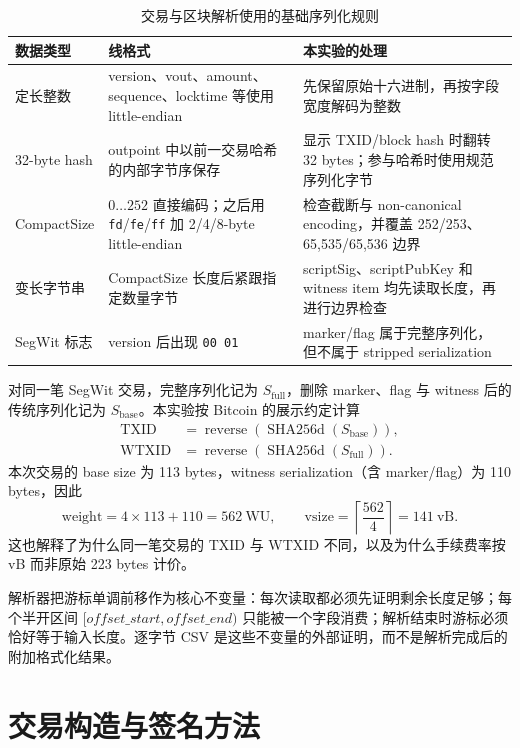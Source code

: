 \documentclass[11pt,a4paper,fontset=none]{ctexart}
\begin{document}
\begin{table}[H]
\centering
\caption{交易与区块解析使用的基础序列化规则}
\label{tab:serialization-rules}
\begin{tabular}{p{}p{}p{}}
\toprule
数据类型 & 线格式 & 本实验的处理 \\
\midrule
定长整数 & version、vout、amount、sequence、locktime 等使用 little-endian & 先保留原始十六进制，再按字段宽度解码为整数 \\
32-byte hash & outpoint 中以前一交易哈希的内部字节序保存 & 显示 TXID/block hash 时翻转 32 bytes；参与哈希时使用规范序列化字节 \\
CompactSize & $0\ldots252$ 直接编码；之后用 \texttt{fd}/\texttt{fe}/\texttt{ff} 加 2/4/8-byte little-endian & 检查截断与 non-canonical encoding，并覆盖 252/253、65,535/65,536 边界 \\
变长字节串 & CompactSize 长度后紧跟指定数量字节 & scriptSig、scriptPubKey 和 witness item 均先读取长度，再进行边界检查 \\
SegWit 标志 & version 后出现 \texttt{00 01} & marker/flag 属于完整序列化，但不属于 stripped serialization \\
\bottomrule
\end{tabular}
\end{table}

对同一笔 SegWit 交易，完整序列化记为 $S_{\mathrm{full}}$，删除 marker、flag 与 witness 后的传统序列化记为 $S_{\mathrm{base}}$。本实验按 Bitcoin 的展示约定计算
\begin{align*}
 \mathrm{TXID}  &= \operatorname{reverse}\!\left(\operatorname{SHA256d}(S_{\mathrm{base}})\right),\\
 \mathrm{WTXID} &= \operatorname{reverse}\!\left(\operatorname{SHA256d}(S_{\mathrm{full}})\right).
\end{align*}
本次交易的 base size 为 113 bytes，witness serialization（含 marker/flag）为 110 bytes，因此
\[
 \mathrm{weight}=4\times113+110=562\ \mathrm{WU},\qquad
 \mathrm{vsize}=\left\lceil\frac{562}{4}\right\rceil=141\ \mathrm{vB}.
\]
这也解释了为什么同一笔交易的 TXID 与 WTXID 不同，以及为什么手续费率按 vB 而非原始 223 bytes 计价。

解析器把游标单调前移作为核心不变量：每次读取都必须先证明剩余长度足够；每个半开区间 $[\textit{offset\_start},\textit{offset\_end})$ 只能被一个字段消费；解析结束时游标必须恰好等于输入长度。逐字节 CSV 是这些不变量的外部证明，而不是解析完成后的附加格式化结果。

\section{交易构造与签名方法}
\end{document}

